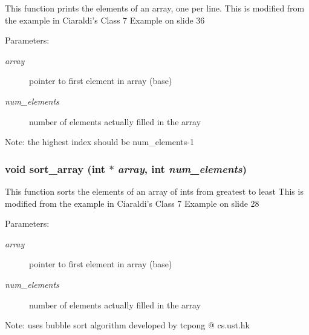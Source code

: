 This function prints the elements of an array, one per line. This is modified from the example in Ciaraldi's Class 7 Example on slide 36 \begin{Desc}
\item[Parameters:]
\begin{description}
\item[{\em array}]pointer to first element in array (base) \item[{\em num\_\-elements}]number of elements actually filled in the array \end{description}
\end{Desc}
\begin{Desc}
\item[Note:]the highest index should be num\_\-elements-1 \end{Desc}
\subsubsection{\setlength{\rightskip}{0pt plus 5cm}void sort\_\-array (int $\ast$ {\em array}, int {\em num\_\-elements})}\label{sort_8c_8896f0ce55dd25259e2141e714d6ef93}


This function sorts the elements of an array of ints from greatest to least This is modified from the example in Ciaraldi's Class 7 Example on slide 28 \begin{Desc}
\item[Parameters:]
\begin{description}
\item[{\em array}]pointer to first element in array (base) \item[{\em num\_\-elements}]number of elements actually filled in the array \end{description}
\end{Desc}
\begin{Desc}
\item[Note:]uses bubble sort algorithm developed by tcpong @ cs.ust.hk \end{Desc}
